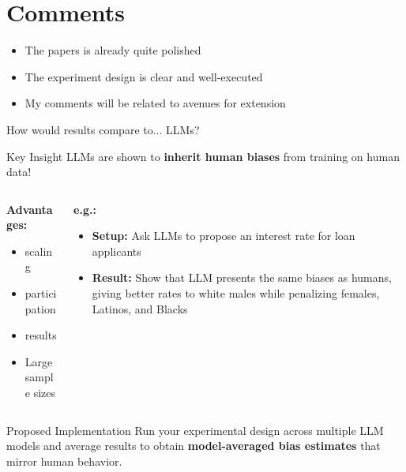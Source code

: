 \section{Comments}

\begin{frame}
\begin{itemize}
	\item The papers is already quite polished
	\item The experiment design is clear and well-executed
	\item My comments will be related to avenues for extension
\end{itemize}
\end{frame}

\begin{frame}{How would results compare to... LLMs?}
    \begin{alertblock}{Key Insight}
        LLMs are shown to \textbf{inherit human biases} from training on human data!
    \end{alertblock}
    
	\bigskip 
    \begin{columns}
        \begin{column}{0.5\textwidth}
            \textbf{Advantages:}
            \begin{itemize}
                \item {} scaling
                \item {} participation
                \item {} results
                \item Large sample sizes
            \end{itemize}
        \end{column}
        \begin{column}{0.5\textwidth}
            \textbf{e.g.: \cite{bowen2024measuring}} 
            \begin{itemize}
                \item \textbf{Setup:} Ask LLMs to propose an interest rate for loan applicants
                \item \textbf{Result:} Show that LLM presents the same biases as humans, giving better rates to white males while penalizing females, Latinos, and Blacks
            \end{itemize}
        \end{column}
    \end{columns}
    
    \bigskip
    \begin{block}{Proposed Implementation}
        Run your experimental design across multiple LLM models and average results to obtain \textbf{model-averaged bias estimates} that mirror human behavior.
    \end{block}
\end{frame}

